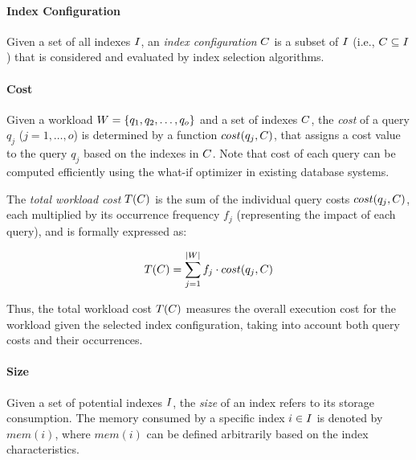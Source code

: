 
\paragraph{Index Configuration} Given a set of all indexes $I$, an \textit{index configuration} $C$ is a subset of $I$ (i.e., $C \subseteq I$) that is considered and evaluated by index selection algorithms.


\paragraph{Cost} Given a workload $W = \{ q_1, q_2, \dots, q_o \}$ and a set of indexes $C$, the \textit{cost} of a query $q_j$ ($j = 1, \dots, o$) is determined by a function $cost(q_j, C)$, that assigns a cost value to the query $q_j$ based on the indexes in $C$. Note that cost of each query can be computed efficiently using the what-if optimizer in existing database systems.%

The \textit{total workload cost} $T(C)$ is the sum of the individual query costs $cost(q_j, C)$, each multiplied by its occurrence frequency $f_j$ (representing the impact of each query), and is formally expressed as:

$$
T(C) = \sum_{j=1}^{|W|} f_j \cdot cost(q_j, C)
$$

Thus, the total workload cost $T(C)$ measures the overall execution cost for the workload given the selected index configuration, taking into account both query costs and their occurrences.

\paragraph{Size} Given a set of potential indexes $I$, the \textit{size} of an index  refers to its storage consumption. The memory consumed by a specific index $i \in I$ is denoted by $mem(i)$, where $mem(i)$ can be defined arbitrarily based on the index characteristics. 

